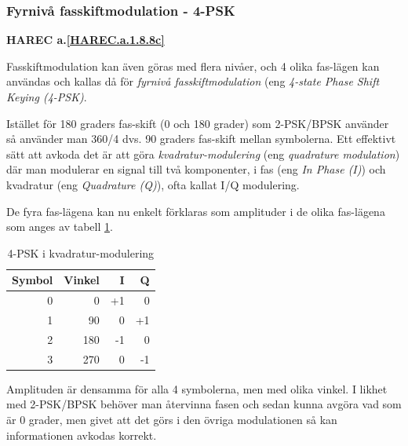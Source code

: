 \subsubsection{Fyrnivå fasskiftmodulation - 4-PSK}
\textbf{HAREC a.\ref{HAREC.a.1.8.8c}\label{myHAREC.a.1.8.8c}}
\begin{rev-nytt}[MAD]

Fasskiftmodulation kan även göras med flera nivåer, och 4 olika fas-lägen
kan användas och kallas då för \emph{fyrnivå fasskiftmodulation} (eng
\emph{4-state Phase Shift Keying (4-PSK)}.

Istället för 180 graders fas-skift (0 och 180 grader) som 2-PSK/BPSK använder
så använder man 360/4 dvs. 90 graders fas-skift mellan symbolerna.
Ett effektivt sätt att avkoda det är att göra \emph{kvadratur-modulering}
(eng \emph{quadrature modulation}) där man modulerar en signal till två
komponenter, i fas (eng \emph{In Phase (I)}) och kvadratur (eng
\emph{Quadrature (Q)}), ofta kallat I/Q modulering.

De fyra fas-lägena kan nu enkelt förklaras som amplituder i de olika fas-lägena
som anges av tabell \ref{tab:4-PSK}.

\begin{table}[h]
\begin{center}
\begin{tabular}{|r|r|r|r|}
\hline
Symbol & Vinkel & I & Q \\ \hline
0 &   0 & +1 &  0 \\
1 &  90 &  0 & +1 \\
2 & 180 & -1 &  0 \\
3 & 270 &  0 & -1 \\ \hline
\end{tabular}
\end{center}
\caption{4-PSK i kvadratur-modulering}
\label{tab:4-PSK}
\end{table}

Amplituden är densamma för alla 4 symbolerna, men med olika vinkel.
I likhet med 2-PSK/BPSK behöver man återvinna fasen och sedan kunna avgöra
vad som är 0 grader, men givet att det görs i den övriga modulationen så
kan informationen avkodas korrekt.

\end{rev-nytt}

